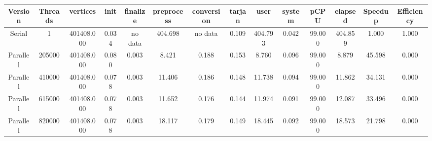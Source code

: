 \begin{tabular}{|c|c|c|c|c|c|c|c|c|c|c|c|c|c|}
\toprule
 Version &  Threads &   vertices &  init & finalize &  preprocess & conversion &  tarjan &    user &  system &   pCPU &  elapsed &  Speedup &  Efficiency \\
\midrule
  Serial &        1 & 401408.000 & 0.034 &  no data &     404.698 &    no data &   0.109 & 404.793 &   0.042 & 99.000 &  404.859 &    1.000 &       1.000 \\
Parallel &   205000 & 401408.000 & 0.080 &    0.003 &       8.421 &      0.188 &   0.153 &   8.760 &   0.096 & 99.000 &    8.879 &   45.598 &       0.000 \\
Parallel &   410000 & 401408.000 & 0.078 &    0.003 &      11.406 &      0.186 &   0.148 &  11.738 &   0.094 & 99.000 &   11.862 &   34.131 &       0.000 \\
Parallel &   615000 & 401408.000 & 0.078 &    0.003 &      11.652 &      0.176 &   0.144 &  11.974 &   0.091 & 99.000 &   12.087 &   33.496 &       0.000 \\
Parallel &   820000 & 401408.000 & 0.078 &    0.003 &      18.117 &      0.179 &   0.149 &  18.445 &   0.092 & 99.000 &   18.573 &   21.798 &       0.000 \\
\bottomrule
\end{tabular}
